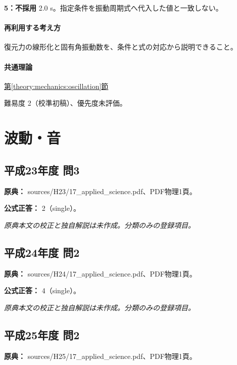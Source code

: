 \noindent\textbf{5：不採用} 2.0 s。指定条件を振動周期式へ代入した値と一致しない。\par

\paragraph{再利用する考え方} 復元力の線形化と固有角振動数を、条件と式の対応から説明できること。

\paragraph{共通理論} \hyperref[theory:mechanics:oscillation]{第\ref*{theory:mechanics:oscillation}節}

\par 難易度 2（校準初稿）、優先度未評価。

\section{波動・音}

\subsection{平成23年度 問3}
\label{q:h23-reg-applied-03}

\noindent\textbf{原典：} sources/H23/17\_applied\_science.pdf、PDF物理1頁。

\textbf{公式正答：} 2（single）。

\par\textit{原典本文の校正と独自解説は未作成。分類のみの登録項目。}

\subsection{平成24年度 問2}
\label{q:h24-reg-applied-02}

\noindent\textbf{原典：} sources/H24/17\_applied\_science.pdf、PDF物理1頁。

\textbf{公式正答：} 4（single）。

\par\textit{原典本文の校正と独自解説は未作成。分類のみの登録項目。}

\subsection{平成25年度 問2}
\label{q:h25-reg-applied-02}

\noindent\textbf{原典：} sources/H25/17\_applied\_science.pdf、PDF物理1頁。

